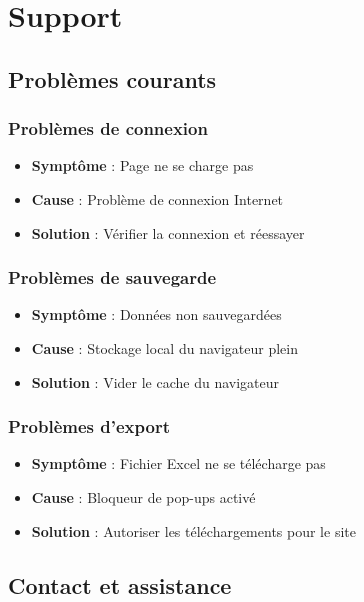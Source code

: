 \documentclass[12pt,a4paper]{report}
\begin{document}
\chapter{Support}

\section{Problèmes courants}

\subsection{Problèmes de connexion}
\begin{itemize}
    \item \textbf{Symptôme} : Page ne se charge pas
    \item \textbf{Cause} : Problème de connexion Internet
    \item \textbf{Solution} : Vérifier la connexion et réessayer
\end{itemize}

\subsection{Problèmes de sauvegarde}
\begin{itemize}
    \item \textbf{Symptôme} : Données non sauvegardées
    \item \textbf{Cause} : Stockage local du navigateur plein
    \item \textbf{Solution} : Vider le cache du navigateur
\end{itemize}

\subsection{Problèmes d'export}
\begin{itemize}
    \item \textbf{Symptôme} : Fichier Excel ne se télécharge pas
    \item \textbf{Cause} : Bloqueur de pop-ups activé
    \item \textbf{Solution} : Autoriser les téléchargements pour le site
\end{itemize}

\section{Contact et assistance}
\end{document}
